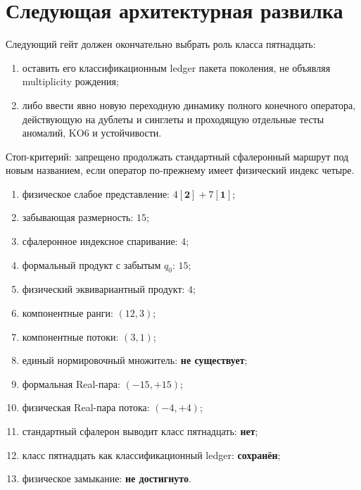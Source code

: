 \section{Следующая архитектурная развилка}

Следующий гейт
должен окончательно выбрать роль класса пятнадцать:
\begin{enumerate}
 \item оставить его классификационным ledger пакета поколения, не
 объявляя multiplicity рождения;
 \item либо ввести явно новую переходную динамику полного конечного
 оператора, действующую на дублеты и синглеты и проходящую отдельные
 тесты аномалий, KO6 и устойчивости.
\end{enumerate}

Стоп-критерий: запрещено продолжать стандартный сфалеронный маршрут под
новым названием, если оператор по-прежнему имеет физический индекс
четыре.

\begin{protocol}
\begin{enumerate}
 \item физическое слабое представление: \textbf{$4[\mathbf2]+7[\mathbf1]$};
 \item забывающая размерность: \textbf{$15$};
 \item сфалеронное индексное спаривание: \textbf{$4$};
 \item формальный продукт с забытым $q_0$: \textbf{$15$};
 \item физический эквивариантный продукт: \textbf{$4$};
 \item компонентные ранги: \textbf{$(12,3)$};
 \item компонентные потоки: \textbf{$(3,1)$};
 \item единый нормировочный множитель: \textbf{не существует};
 \item формальная Real-пара: \textbf{$(-15,+15)$};
 \item физическая Real-пара потока: \textbf{$(-4,+4)$};
 \item стандартный сфалерон выводит класс пятнадцать: \textbf{нет};
 \item класс пятнадцать как классификационный ledger: \textbf{сохранён};
 \item физическое замыкание: \textbf{не достигнуто}.
\end{enumerate}
\end{protocol}

